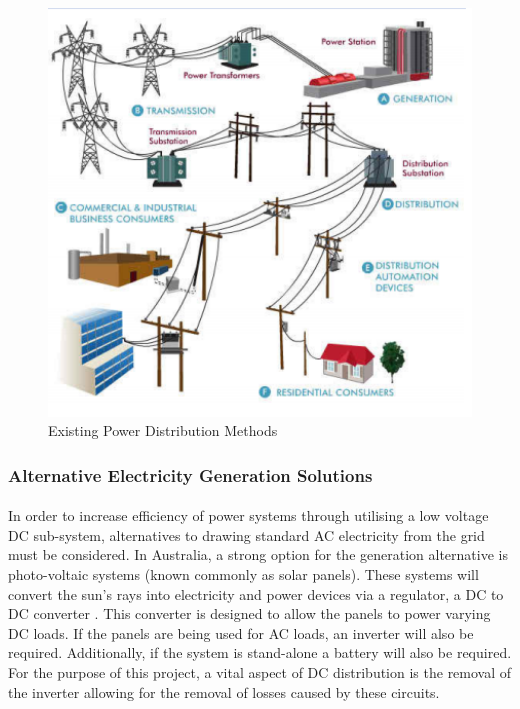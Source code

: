 \begin{figure}[H]
\hfill\includegraphics[width = 130mm]{images/Power_Distro}\hspace*{\fill}
\caption{Existing Power Distribution Methods \cite{Active2015}}
\label{fig:ExistingPower}
\end{figure}    

\subsubsection{Alternative Electricity Generation Solutions}

\paragraph{}
In order to increase efficiency of power systems through utilising a low voltage DC sub-system, alternatives to drawing standard AC electricity from the grid must be considered. In Australia, a strong option for the generation alternative is photo-voltaic systems (known commonly as solar panels). These systems will convert the sun’s rays into electricity and power devices via a regulator, a DC to DC converter \cite{Pillay2004}. This converter is designed to allow the panels to power varying DC loads. If the panels are being used for AC loads, an inverter will also be required. Additionally, if the system is stand-alone a battery will also be required. For the purpose of this project, a vital aspect of DC distribution is the removal of the inverter allowing for the removal of losses caused by these circuits.      

